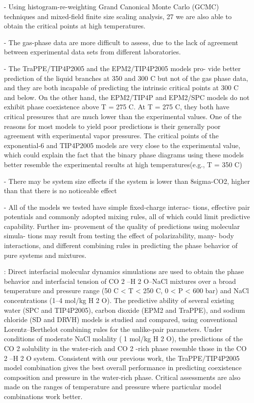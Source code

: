 - Using histogram-re-weighting Grand Canonical Monte Carlo (GCMC) techniques 
and mixed-ﬁeld ﬁnite size scaling analysis, 27 we are also able to obtain the critical points at high temperatures.

- The gas-phase data are more diﬃcult to assess, due to the lack
of agreement between experimental data sets from diﬀerent
laboratories. 

- The TraPPE/TIP4P2005 and the EPM2/TIP4P2005 models pro-
vide better prediction of the liquid branches at 350 and 300 C
but not of the gas phase data, and they are both incapable of
predicting the intrinsic critical points at 300 C and below. On
the other hand, the EPM2/TIP4P and EPM2/SPC models do
not exhibit phase coexistence above T = 275 C. At T = 275 C,
they both have critical pressures that are much lower than the
experimental values. One of the reasons for most models to yield poor predictions is their generally poor agreement with experimental vapor
pressures. The critical points of the exponential-6 and TIP4P2005 models are very close to the experimental value, which could explain the fact that the
binary phase diagrams using these models better resemble the
experimental results at high temperatures(e.g., T = 350 C)

- There may be system size effects if the system is lower than 8sigma-CO2, higher than that there is no noticeable effect

- All of the models we tested have simple ﬁxed-charge interac-
tions, eﬀective pair potentials and commonly adopted mixing
rules, all of which could limit predictive capability. Further im-
provement of the quality of predictions using molecular simula-
tions may result from testing the eﬀect of polarizability, many-
body interactions, and diﬀerent combining rules in predicting the
phase behavior of pure systems and mixtures. 



\cite{Liu2013}: Direct interfacial molecular dynamics simulations are used to obtain the phase behavior and interfacial tension of CO 2 –H 2 O–NaCl mixtures over a broad temperature and pressure range (50 C < T < 250 C, 0 < P < 600 bar) and NaCl concentrations (1–4 mol/kg H 2 O). The predictive ability of several existing water (SPC and TIP4P2005), carbon dioxide (EPM2 and TraPPE), and sodium chloride (SD and DRVH) models is studied and compared, using conventional Lorentz–Berthelot combining rules for the unlike-pair parameters. Under conditions of moderate NaCl molality (1 mol/kg
H 2 O), the predictions of the CO 2 solubility in the water-rich and CO 2 -rich phase resemble those in the CO 2 –H 2 O system. Consistent with our previous work, the TraPPE/TIP4P2005 model combination gives the best overall performance in predicting coexistence composition and pressure in the water-rich phase. Critical assessments are also made on the ranges of temperature and pressure where particular model combinations work better.

